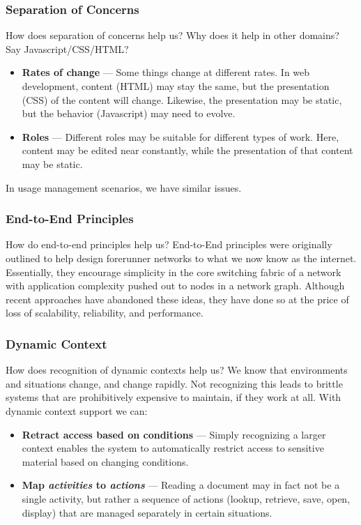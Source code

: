 \documentclass[t,handout, 10pt]{beamer}
\begin{document}
\begin{frame}
\frametitle{Separation of Concerns}
How does separation of concerns help us?
\newline
\newline
\pause
Why does it help in other domains? Say Javascript/CSS/HTML?
\begin{itemize}
\item \textbf{Rates of change} --- Some things change at different rates.  In web development, content (HTML) may stay the same, but the presentation (CSS) of the content will change.  Likewise, the presentation may be static, but the behavior (Javascript)  may need to evolve.
\item \textbf{Roles} --- Different roles may be suitable for different types of work.  Here, content may be edited near constantly, while the presentation of that content may be static.
\end{itemize}
\pause
In usage management scenarios, we have similar issues.
\end{frame}

\begin{frame}
\frametitle{End-to-End Principles}
How do end-to-end principles help us?
\newline
\newline
\pause
End-to-End principles were originally outlined to help design forerunner networks to what we now know as the internet.
\newline
\newline
\pause
Essentially, they encourage simplicity in the core switching fabric of a network with application complexity pushed out to nodes in a network graph.
\newline
\newline
\pause
Although recent approaches have abandoned these ideas, they have done so at the price of loss of scalability, reliability, and performance.
\end{frame}

\begin{frame}
\frametitle{Dynamic Context}
How does recognition of dynamic contexts help us?
\newline
\newline
\pause
We know that environments and situations change, and change rapidly.  Not recognizing this leads to brittle systems that are prohibitively expensive to maintain, if they work at all.
\newline
\newline
\pause
With dynamic context support we can:
\begin{itemize}
\item \textbf{Retract access based on conditions} --- Simply recognizing a larger context enables the system to automatically restrict access to sensitive material based on changing conditions.
\pause
\item\textbf{Map \textit{activities} to \textit{actions}} --- Reading a document may in fact not be a single activity, but rather a sequence of actions (lookup, retrieve, save, open, display) that are managed separately in certain situations.
\end{itemize}
\end{frame}
\end{document}

